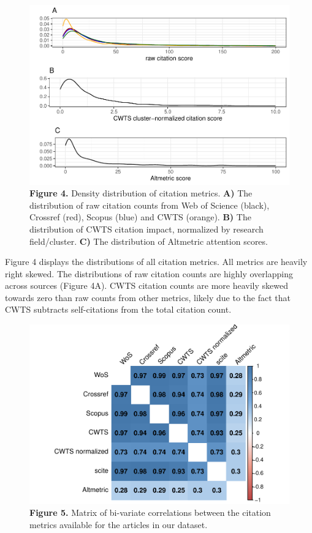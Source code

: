 \documentclass[
  man,floatsintext]{apa6}
\begin{document}
\begin{figure}
\centering
\includegraphics{RVcn_feasibility_in_social_neuroscience_files/figure-latex/fig4-1.pdf}
\caption{\label{fig:fig4}\textbf{Figure 4.} Density distribution of citation metrics. \textbf{A)} The distribution of raw citation counts from Web of Science (black), Crossref (red), Scopus (blue) and CWTS (orange). \textbf{B)} The distribution of CWTS citation impact, normalized by research field/cluster. \textbf{C)} The distribution of Altmetric attention scores.}
\end{figure}

Figure 4 displays the distributions of all citation metrics. All metrics are heavily right skewed. The distributions of raw citation counts are highly overlapping across sources (Figure 4A). CWTS citation counts are more heavily skewed towards zero than raw counts from other metrics, likely due to the fact that CWTS subtracts self-citations from the total citation count.

\begin{figure}
\centering
\includegraphics{RVcn_feasibility_in_social_neuroscience_files/figure-latex/fig5-1.pdf}
\caption{\label{fig:fig5}\textbf{Figure 5.} Matrix of bi-variate correlations between the citation metrics available for the articles in our dataset.}
\end{figure}
\end{document}
